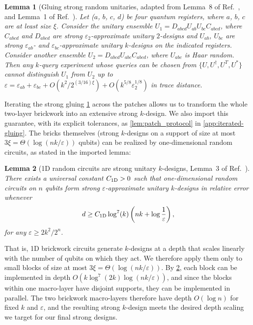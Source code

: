 \documentclass[
    aps,
    superscriptaddress,
    onecolumn,
    10pt,
    prx,
    nofootinbib
]{revtex4-2}
\newtheorem{lemma}{Lemma}
\theoremstyle{namedstatement}
\theoremstyle{plain}
\begin{document}
\begin{lemma}[Gluing strong random unitaries, adapted from Lemma~8 of Ref.~\cite{FolkertsmaEtAl2026}, and Lemma~1 of Ref.~\cite{SchusterEtAlStrong2025}]
\label{lem:gluing_strong_random_unitaries}
Let ($a$, $b$, $c$, $d$) be four quantum registers, where $a$, $b$, $c$ are at least size $\xi$. Consider
the unitary ensemble $U_1 = D_{abcd}U_{ab}U_{bc}C_{abcd}$, where $C_{abcd}$ and $D_{abcd}$ are strong
$\varepsilon_2$-approximate unitary $2$-designs and $U_{ab}$, $U_{bc}$ are strong
$\varepsilon_{ab}$- and $\varepsilon_{bc}$-approximate unitary $k$-designs on the indicated registers. Consider another ensemble $U_2 = D_{abcd}U_{abc}C_{abcd}$, where $U_{abc}$ is Haar
random. Then any $k$-query experiment whose queries can be chosen from $\{U, U^\dagger, U^{T}, U^*\}$
cannot distinguish $U_1$ from $U_2$ up to
$\varepsilon = \varepsilon_{ab} + \varepsilon_{bc} + O\!\left(k^{2}/2^{(3/16)\xi}\right)
+ O\!\left(k^{5/8}\varepsilon_{2}^{1/8}\right)$ in trace distance.
\end{lemma}

Iterating the strong gluing \cref{lem:gluing_strong_random_unitaries} across the patches allows us to transform the whole two-layer brickwork into an extensive strong $k$-design. We also import this
guarantee, with its explicit tolerances, as \cref{lem:patch_protocol} in
\cref{app:iterated-gluing}. The bricks themselves (strong $k$-designs on a support of size at most
$3\xi=\Theta(\log(nk/\varepsilon))$ qubits) can be realized by one-dimensional random circuits, as stated in the imported lemma:

\begin{lemma}[1D random circuits are strong unitary $k$-designs, Lemma~3 of Ref.~\cite{SchusterEtAlStrong2025}]
There exists a universal constant $C_{\rm 1D}>0$ such that one-dimensional random circuits on $n$ qubits form strong
$\varepsilon$-approximate unitary $k$-designs in relative error whenever
\begin{equation*}
    d
    \geq
    C_{\rm 1D}
    \log^{7}(k)
    \left(
        nk+\log\frac{1}{\varepsilon}
    \right),
\end{equation*}
for any $\varepsilon \geq 2k^{2}/2^{n}$.

\label{lem:1D_strong_unitary_designs}
\end{lemma}

That is, 1D brickwork circuits generate $k$-designs at a depth that scales linearly with the number of qubits on which they act. We therefore apply them only to small blocks of size at most
$3\xi=\Theta(\log(nk/\varepsilon))$. By \cref{lem:1D_strong_unitary_designs}, each block can be implemented in depth $O(k\log^7(2k)\log(nk/\varepsilon))$, and since the blocks within one macro-layer have
disjoint supports, they can be implemented in parallel. The two brickwork macro-layers therefore have depth $O(\log n)$ for fixed $k$ and $\varepsilon$, and the resulting strong $k$-design meets the desired depth scaling we target for our final strong designs.
\end{document}

